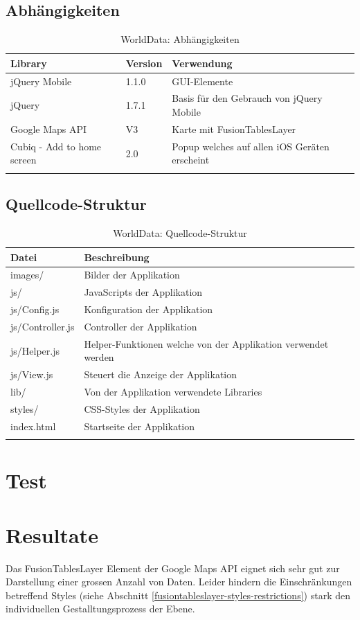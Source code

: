 \subsection{Abhängigkeiten}
\begin{longtable}{|l|l|p{8cm}|}
\hline 
\textbf{Library} & \textbf{Version} & \textbf{Verwendung} \\ 
\hline 
jQuery Mobile & 1.1.0 & GUI-Elemente \\ 
\hline 
jQuery & 1.7.1 & Basis für den Gebrauch von jQuery Mobile \\ 
\hline 
Google Maps API & V3 & Karte mit FusionTablesLayer \\ 
\hline 
Cubiq - Add to home screen & 2.0 & Popup welches auf allen iOS Geräten erscheint \\ 
\hline 
\caption{WorldData: Abhängigkeiten}
\end{longtable} 

\subsection{Quellcode-Struktur}
\begin{longtable}{|l|p{12.5cm}|}
\hline 
\textbf{Datei} & \textbf{Beschreibung} \\ 
\hline 
images/ & Bilder der Applikation \\ 
\hline 
js/ & JavaScripts der Applikation \\ 
\hline 
js/Config.js & Konfiguration der Applikation \\ 
\hline 
js/Controller.js & Controller der Applikation \\ 
\hline 
js/Helper.js & Helper-Funktionen welche von der Applikation verwendet werden \\ 
\hline 
js/View.js & Steuert die Anzeige der Applikation \\ 
\hline 
lib/ & Von der Applikation verwendete Libraries \\ 
\hline 
styles/ & CSS-Styles der Applikation \\ 
\hline
index.html & Startseite der Applikation \\ 
\hline
\caption{WorldData: Quellcode-Struktur}
\end{longtable} 

\section{Test}

\section{Resultate}
Das FusionTablesLayer Element der Google Maps API eignet sich sehr gut zur Darstellung einer grossen Anzahl von Daten. Leider hindern die Einschränkungen betreffend Styles (siehe Abschnitt  \ref{fusiontableslayer-styles-restrictions}) stark den individuellen Gestalltungsprozess der Ebene.

